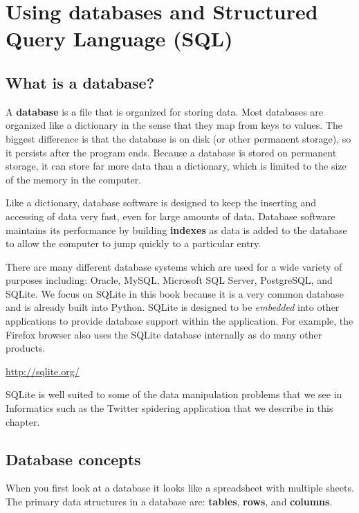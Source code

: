 \documentclass[11pt]{book}
\begin{document}
\chapter{Using databases and Structured Query Language (SQL)}

\section{What is a database?}

A {\bf database} is a file that is organized for storing data.
Most databases are organized like a dictionary in the sense
that they map from keys to values.  The biggest difference
is that the database is on disk (or other permanent storage),
so it persists after the program ends.  Because a database is
stored on permanent storage, it can store far more data than
a dictionary, which is limited to the size of the memory 
in the computer.

Like a dictionary, database software is designed to keep 
the inserting and accessing of data very fast, even for large
amounts of data.   Database software maintains its performance by 
building {\bf indexes} as data is added to the database
to allow the computer to jump quickly to a particular
entry.

There are many different database systems which are used for a wide
variety of purposes including: Oracle, MySQL, Microsoft SQL Server, 
PostgreSQL, and SQLite.  We focus on SQLite in this book because
it is a very common database and is already built into Python.  
SQLite is designed to be \emph{embedded} into other applications
to provide database support within the application.  For example,
the Firefox browser also uses the SQLite database internally as do 
many other products.

\url{http://sqlite.org/}

SQLite is well suited to some of the data manipulation problems that we 
see in Informatics such as the Twitter spidering application that we 
describe in this chapter.

\section{Database concepts}

When you first look at a database it looks like a 
spreadsheet with multiple sheets.   The primary data structures 
in a database are:
{\bf tables}, {\bf rows}, and {\bf columns}.  
\end{document}
